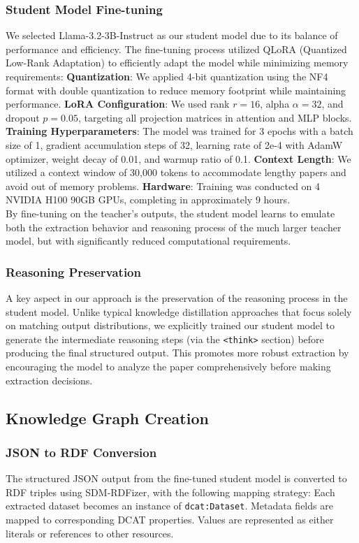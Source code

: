 \documentclass[runningheads]{llncs}
\begin{document}
\subsubsection{Student Model Fine-tuning}
We selected Llama-3.2-3B-Instruct as our student model due to its balance of performance and efficiency. The fine-tuning process utilized QLoRA (Quantized Low-Rank Adaptation) \cite{dettmers2023qlora} to efficiently adapt the model while minimizing memory requirements:
     \textbf{Quantization}: We applied 4-bit quantization using the NF4 format with double quantization to reduce memory footprint while maintaining performance.
     \textbf{LoRA Configuration}: We used rank \(r=16\), alpha \(\alpha=32\), and dropout \(p=0.05\), targeting all projection matrices in attention and MLP blocks.
     \textbf{Training Hyperparameters}: The model was trained for 3 epochs with a batch size of 1, gradient accumulation steps of 32, learning rate of 2e-4 with AdamW optimizer, weight decay of 0.01, and warmup ratio of 0.1.
     \textbf{Context Length}: We utilized a context window of 30,000 tokens to accommodate lengthy papers and avoid out of memory problems.
     \textbf{Hardware}: Training was conducted on 4 NVIDIA H100 90GB GPUs, completing in approximately 9 hours.
\\
\noindent
By fine-tuning on the teacher's outputs, the student model learns to emulate both the extraction behavior and reasoning process of the much larger teacher model, but with significantly reduced computational requirements.

\subsubsection{Reasoning Preservation}
A key aspect in our approach is the preservation of the reasoning process in the student model. Unlike typical knowledge distillation approaches that focus solely on matching output distributions, we explicitly trained our student model to generate the intermediate reasoning steps (via the \texttt{<think>} section) before producing the final structured output. This promotes more robust extraction by encouraging the model to analyze the paper comprehensively before making extraction decisions.

\subsection{Knowledge Graph Creation}
\subsubsection{JSON to RDF Conversion}
The structured JSON output from the fine-tuned student model is converted to RDF triples using SDM-RDFizer\cite{iglesias2020sdm}, with the following mapping strategy:
     Each extracted dataset becomes an instance of \texttt{dcat:Dataset}.
     Metadata fields are mapped to corresponding DCAT properties.
     Values are represented as either literals or references to other resources. %
\end{document}
